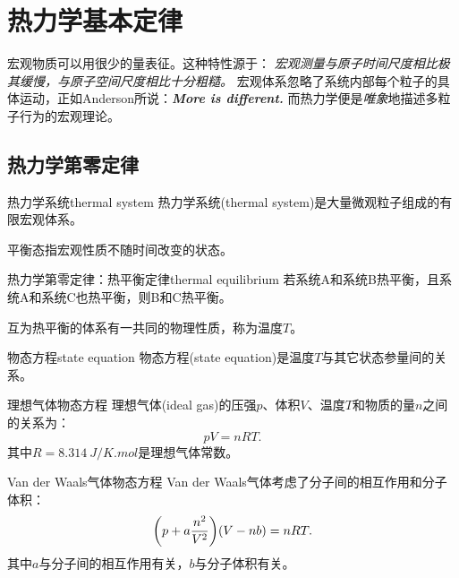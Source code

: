 
\chapter{热力学基本定律}


宏观物质可以用很少的量表征。这种特性源于：
\textit{宏观测量与原子时间尺度相比极其缓慢，与原子空间尺度相比十分粗糙。}
宏观体系忽略了系统内部每个粒子的具体运动，正如Anderson所说：\textbf{\textit{More is different.}}
而热力学便是\textit{唯象}地描述多粒子行为的宏观理论。

\section{热力学第零定律}

\begin{definition}{热力学系统}{thermal system}
	热力学系统(thermal system)是大量微观粒子组成的有限宏观体系。
\end{definition}

平衡态指宏观性质不随时间改变的状态。

\begin{theorem}{热力学第零定律：热平衡定律}{thermal equilibrium}
	若系统A和系统B热平衡，且系统A和系统C也热平衡，则B和C热平衡。
\end{theorem}

\begin{corollary}
	互为热平衡的体系有一共同的物理性质，称为温度$T$。
\end{corollary}

\begin{definition}{物态方程}{state equation}
	物态方程(state equation)是温度$T$与其它状态参量间的关系。
\end{definition}

\begin{example}
	{理想气体物态方程}{}
	理想气体(ideal gas)的压强$p$、体积$V$、温度$T$和物质的量$n$之间的关系为：
	\begin{equation}
		pV=nRT.
	\end{equation}
	其中$R=\SI{8.314}{J/K.mol}$是理想气体常数。
\end{example}

\begin{example}
	{Van der Waals气体物态方程}{}
	Van der Waals气体考虑了分子间的相互作用和分子体积：
	\begin{equation}
		\biggl(p+a\frac{n^2}{V^2}\biggr)(V-nb)=nRT.
	\end{equation}
	其中$a$与分子间的相互作用有关，$b$与分子体积有关。
\end{example}

